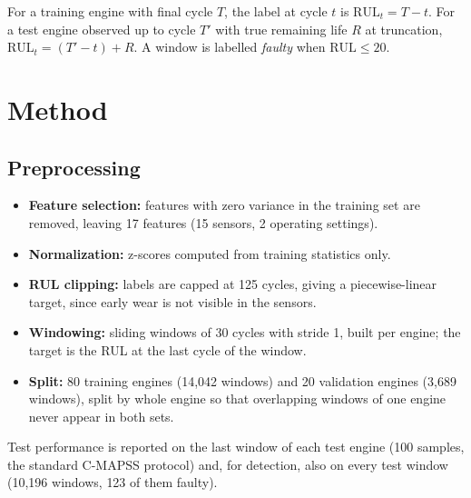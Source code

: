 \documentclass[11pt,a4paper]{article}
\begin{document}
For a training engine with final cycle $T$, the label at cycle $t$ is
$\mathrm{RUL}_t = T - t$. For a test engine observed up to cycle $T'$ with
true remaining life $R$ at truncation, $\mathrm{RUL}_t = (T' - t) + R$.
A window is labelled \emph{faulty} when $\mathrm{RUL} \le 20$.

\section{Method}

\subsection{Preprocessing}
\begin{itemize}
  \item \textbf{Feature selection:} features with zero variance in the training
        set are removed, leaving 17 features (15 sensors, 2 operating settings).
  \item \textbf{Normalization:} z-scores computed from training statistics only.
  \item \textbf{RUL clipping:} labels are capped at 125 cycles, giving a
        piecewise-linear target, since early wear is not visible in the sensors.
  \item \textbf{Windowing:} sliding windows of 30 cycles with stride 1, built per
        engine; the target is the RUL at the last cycle of the window.
  \item \textbf{Split:} 80 training engines (14{,}042 windows) and 20
        validation engines (3{,}689 windows), split by whole engine so that
        overlapping windows of one engine never appear in both sets.
\end{itemize}
Test performance is reported on the last window of each test engine (100
samples, the standard C-MAPSS protocol) and, for detection, also on every test
window (10{,}196 windows, 123 of them faulty).
\end{document}
